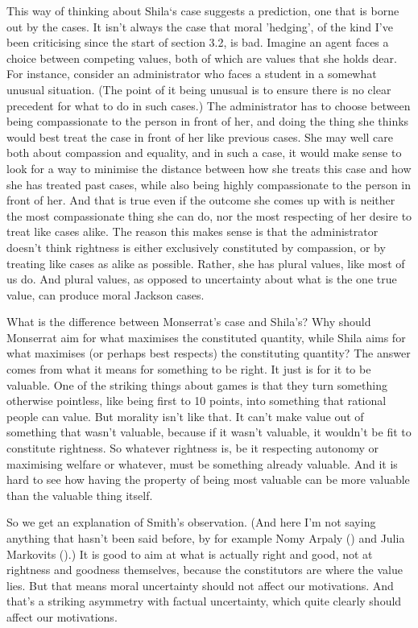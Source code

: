 \documentclass[
  10pt,
  letterpaper,
  twoside]{scrbook}
\begin{document}
This way of thinking about {Shila}`s case suggests a prediction, one
that is borne out by the cases. It isn't always the case that moral
'hedging', of the kind I've been criticising since the start of section
3.2, is bad. Imagine an agent faces a choice between competing values,
both of which are values that she holds dear. For instance, consider an
administrator who faces a student in a somewhat unusual situation. (The
point of it being unusual is to ensure there is no clear precedent for
what to do in such cases.) The administrator has to choose between being
compassionate to the person in front of her, and doing the thing she
thinks would best treat the case in front of her like previous cases.
She may well care both about compassion and equality, and in such a
case, it would make sense to look for a way to minimise the distance
between how she treats this case and how she has treated past cases,
while also being highly compassionate to the person in front of her. And
that is true even if the outcome she comes up with is neither the most
compassionate thing she can do, nor the most respecting of her desire to
treat like cases alike. The reason this makes sense is that the
administrator doesn't think rightness is either exclusively constituted
by compassion, or by treating like cases as alike as possible. Rather,
she has plural values, like most of us do. And plural values, as opposed
to uncertainty about what is the one true value, can produce moral
Jackson cases.

What is the difference between {Monserrat}'s case and {Shila}'s? Why
should {Monserrat} aim for what maximises the constituted quantity,
while {Shila} aims for what maximises (or perhaps best respects) the
constituting quantity? The answer comes from what it means for something
to be right. It just is for it to be valuable. One of the striking
things about games is that they turn something otherwise pointless, like
being first to 10 points, into something that rational people can value.
But morality isn't like that. It can't make value out of something that
wasn't valuable, because if it wasn't valuable, it wouldn't be fit to
constitute rightness. So whatever rightness is, be it respecting
autonomy or maximising welfare or whatever, must be something already
valuable. And it is hard to see how having the property of being most
valuable can be more valuable than the valuable thing itself.

So we get an explanation of Smith's observation. (And here I'm not
saying anything that hasn't been said before, by for example Nomy Arpaly
() and Julia Markovits
().) It is good to aim at what is
actually right and good, not at rightness and goodness themselves,
because the constitutors are where the value lies. But that means moral
uncertainty should not affect our motivations. And that's a striking
asymmetry with factual uncertainty, which quite clearly should affect
our motivations.
\end{document}
